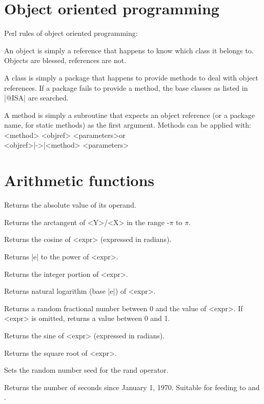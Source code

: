 \documentclass{refbase}
\begin{document}
\section{Object oriented programming} 

Perl rules of object oriented programming:

\begin{enum}{3mm}

\Xj{$\bullet$}
An object is simply a reference that happens to know which class it
belongs to.
\newline Objects are blessed, references are not.

\Xj{$\bullet$}
A class is simply a package that happens to provide methods to deal
with object references.
\newline If a package fails to provide a method, the base classes as
listed in |@ISA| are searched.

\Xj{$\bullet$}
A method is simply a subroutine that expects an object reference (or a
package name, for static methods) as the first argument.
\newline Methods can be applied with:\\
\hspace*{1cm}<method> <objref> <parameters>\quad\quad\quad\quad or\\
\hspace*{1cm}<objref>|->|<method> <parameters>

\end{enum}


\section{Arithmetic functions} 

\begin{enum}{1cm}

Returns the absolute value of its operand.

Returns the arctangent of <Y>/<X> in the range -$\pi$ to $\pi$.

Returns the cosine of <expr> (expressed in radians).

Returns |e| to the power of <expr>.

Returns the integer portion of <expr>.

Returns natural logarithm (base |e|) of <expr>.

Returns a random fractional number between 0 and the value of <expr>.
If <expr> is omitted, returns a value between 0 and 1. 

Returns the sine of <expr> (expressed in radians).

Returns the square root of <expr>.

Sets the random number seed for the rand operator.

Returns the number of seconds since January 1, 1970. Suitable for
feeding to  and . 

\end{enum}
\end{document}
